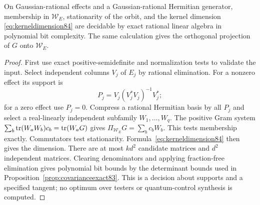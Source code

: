 \begin{proposition}\label{prop:supportexact84}
On Gaussian-rational effects and a Gaussian-rational Hermitian
generator, membership in $\mathcal W_E$, stationarity of the orbit,
and the kernel dimension \eqref{eq:kerneldimension84} are decidable
by exact rational linear algebra in polynomial bit complexity.
The same calculation gives the orthogonal projection of $G$ onto
$\mathcal W_E$.
\end{proposition}
\begin{proof}
First use exact positive-semidefinite and normalization tests to
validate the input.  Select independent columns $V_j$ of $E_j$ by
rational elimination.  For a nonzero effect its support is
\[
 P_j=V_j(V_j^*V_j)^{-1}V_j^*;
\]
for a zero effect use $P_j=0$.  Compress a rational Hermitian basis
by all $P_j$ and select a real-linearly independent subfamily
$W_1,\ldots,W_q$.  The positive Gram system
$\sum_b\operatorname{tr}(W_aW_b)c_b=\operatorname{tr}(W_aG)$ gives
$\Pi_{\mathcal W_E}G=\sum_bc_bW_b$.  This tests membership exactly.
Commutators test stationarity.  Formula~\eqref{eq:kerneldimension84}
then gives the dimension.  There are at most $kd^2$ candidate
matrices and $d^2$ independent matrices.  Clearing denominators
and applying fraction-free elimination gives polynomial bit
bounds by the determinant bounds used in
Proposition~\ref{prop:covarianceexact83}.  This is a decision about
supports and a specified tangent; no optimum over testers or
quantum-control synthesis is computed.
\end{proof}
